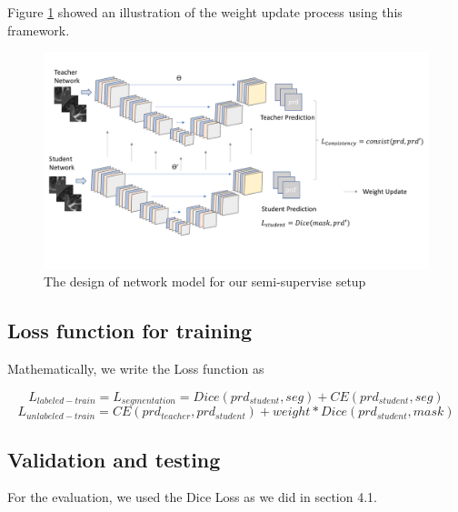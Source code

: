  Figure \ref{fig:mean-teacher-training} showed an illustration of the weight update process using this framework.
\begin{figure}[h]
	\centering
	\includegraphics[width=\textwidth]{img/Networks/mean-teacher-net}
	\caption{The design of network model for our semi-supervise setup}
	\label{fig:mean-teacher-training}
\end{figure}

\subsection{Loss function for training}
Mathematically, we write the Loss function as

$$L_{labeled-train} = L_{segmentation} = Dice(prd_{student}, seg) + CE(prd_{student}, seg)$$ 
$$L_{unlabeled-train} = CE(prd_{teacher}, prd_{student}) + weight * Dice(prd_{student}, mask) $$
\subsection{Validation and testing}
For the evaluation, we used the Dice Loss as we did in section 4.1.

